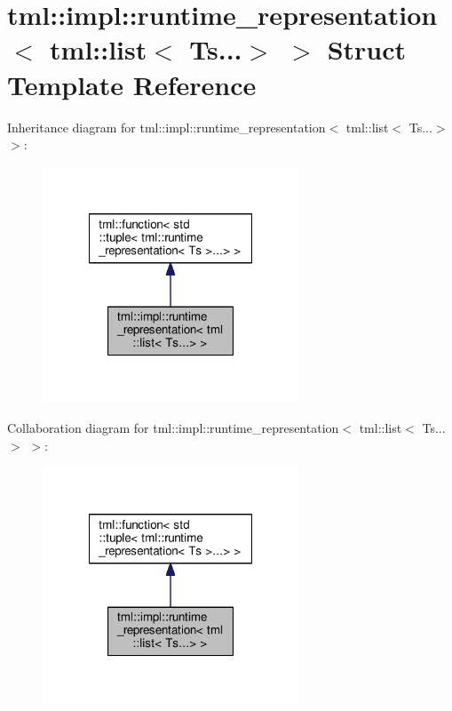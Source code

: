 \hypertarget{structtml_1_1impl_1_1runtime__representation_3_01tml_1_1list_3_01_ts_8_8_8_4_01_4}{\section{tml\+:\+:impl\+:\+:runtime\+\_\+representation$<$ tml\+:\+:list$<$ Ts...$>$ $>$ Struct Template Reference}
\label{structtml_1_1impl_1_1runtime__representation_3_01tml_1_1list_3_01_ts_8_8_8_4_01_4}
}


Inheritance diagram for tml\+:\+:impl\+:\+:runtime\+\_\+representation$<$ tml\+:\+:list$<$ Ts...$>$ $>$\+:
\nopagebreak
\begin{figure}[H]
\begin{center}
\leavevmode
\includegraphics[width=216pt]{structtml_1_1impl_1_1runtime__representation_3_01tml_1_1list_3_01_ts_8_8_8_4_01_4__inherit__graph}
\end{center}
\end{figure}


Collaboration diagram for tml\+:\+:impl\+:\+:runtime\+\_\+representation$<$ tml\+:\+:list$<$ Ts...$>$ $>$\+:
\nopagebreak
\begin{figure}[H]
\begin{center}
\leavevmode
\includegraphics[width=216pt]{structtml_1_1impl_1_1runtime__representation_3_01tml_1_1list_3_01_ts_8_8_8_4_01_4__coll__graph}
\end{center}
\end{figure}
